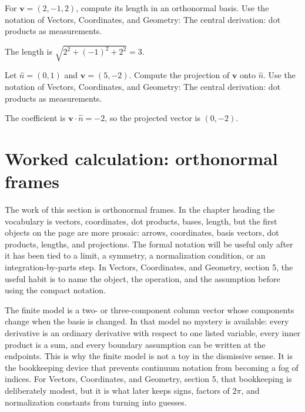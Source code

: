 \begin{exercise}
For \(\bm v=(2,-1,2)\), compute its length in an orthonormal basis.  Use the notation of Vectors, Coordinates, and Geometry: The central derivation: dot products as measurements.
\begin{answer}
The length is \(\sqrt{2^2+(-1)^2+2^2}=3\).
\end{answer}
\end{exercise}

\begin{exercise}
Let \(\hat n=(0,1)\) and \(\bm v=(5,-2)\).  Compute the projection of \(\bm v\) onto \(\hat n\).  Use the notation of Vectors, Coordinates, and Geometry: The central derivation: dot products as measurements.
\begin{answer}
The coefficient is \(\bm v\cdot\hat n=-2\), so the projected vector is \((0,-2)\).
\end{answer}
\end{exercise}



\section{Worked calculation: orthonormal frames}

The work of this section is orthonormal frames.  In the chapter heading the vocabulary is vectors, coordinates, dot products, bases, length, but the first objects on the page are more prosaic: arrows, coordinates, basis vectors, dot products, lengths, and projections.  The formal notation will be useful only after it has been tied to a limit, a symmetry, a normalization condition, or an integration-by-parts step.  In Vectors, Coordinates, and Geometry, section 5, the useful habit is to name the object, the operation, and the assumption before using the compact notation.

The finite model is a two- or three-component column vector whose components change when the basis is changed.  In that model no mystery is available: every derivative is an ordinary derivative with respect to one listed variable, every inner product is a sum, and every boundary assumption can be written at the endpoints.  This is why the finite model is not a toy in the dismissive sense.  It is the bookkeeping device that prevents continuum notation from becoming a fog of indices.  For Vectors, Coordinates, and Geometry, section 5, that bookkeeping is deliberately modest, but it is what later keeps signs, factors of \(2\pi\), and normalization constants from turning into guesses.

